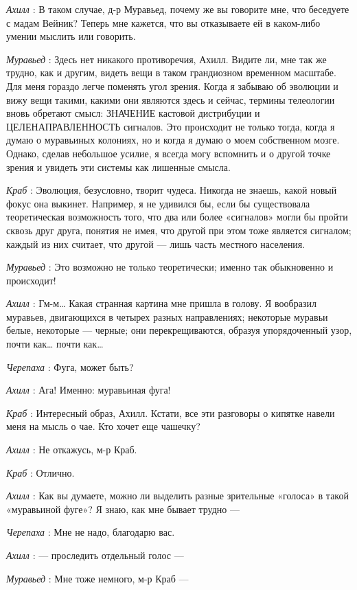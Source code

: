 \documentclass[../main.tex]{subfiles}
\begin{document}
\begin{dialogue}
\emph{Ахилл} : В таком случае, д-р Муравьед, почему же вы говорите мне, что беседуете с мадам Вейник? Теперь мне кажется, что вы отказываете ей в каком-либо умении мыслить или говорить.

\emph{Муравьед} : Здесь нет никакого противоречия, Ахилл. Видите ли, мне так же трудно, как и другим, видеть вещи в таком грандиозном временном масштабе. Для меня гораздо легче поменять угол зрения. Когда я забываю об эволюции и вижу вещи такими, какими они являются здесь и сейчас, термины телеологии вновь обретают смысл: ЗНАЧЕНИЕ кастовой дистрибуции и ЦЕЛЕНАПРАВЛЕННОСТЬ сигналов. Это происходит не только тогда, когда я думаю о муравьиных колониях, но и когда я думаю о моем собственном мозге. Однако, сделав небольшое усилие, я всегда могу вспомнить и о другой точке зрения и увидеть эти системы как лишенные смысла.

\emph{Краб} : Эволюция, безусловно, творит чудеса. Никогда не знаешь, какой новый фокус она выкинет. Например, я не удивился бы, если бы существовала теоретическая возможность того, что два или более «сигналов» могли бы пройти сквозь друг друга, понятия не имея, что другой при этом тоже является сигналом; каждый из них считает, что другой --- лишь часть местного населения.

\emph{Муравьед} : Это возможно не только теоретически; именно так обыкновенно и происходит!

\emph{Ахилл} : Гм-м\ldots{} Какая странная картина мне пришла в голову. Я вообразил муравьев, двигающихся в четырех разных направлениях; некоторые муравьи белые, некоторые --- черные; они перекрещиваются, образуя упорядоченный узор, почти как\ldots{} почти как\ldots{}

\emph{Черепаха} : Фуга, может быть?

\emph{Ахилл} : Ага! Именно: муравьиная фуга!

\emph{Краб} : Интересный образ, Ахилл. Кстати, все эти разговоры о кипятке навели меня на мысль о чае. Кто хочет еще чашечку?

\emph{Ахилл} : Не откажусь, м-р Краб.

\emph{Краб} : Отлично.

\emph{Ахилл} : Как вы думаете, можно ли выделить разные зрительные «голоса» в такой «муравьиной фуге»? Я знаю, как мне бывает трудно ---

\emph{Черепаха} : Мне не надо, благодарю вас.

\emph{Ахилл} : --- проследить отдельный голос ---

\emph{Муравьед} : Мне тоже немного, м-р Краб ---


\end{dialogue}
\end{document}
